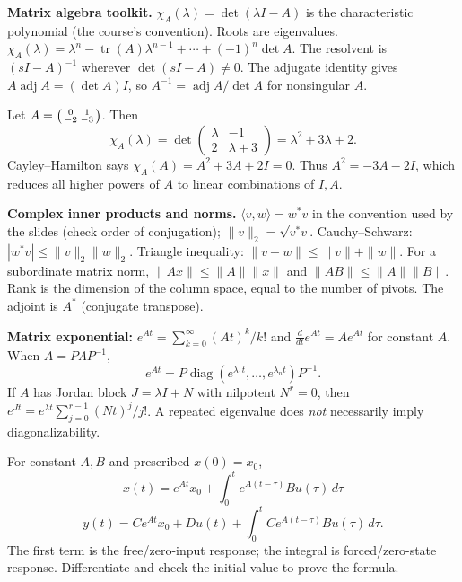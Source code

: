 \documentclass[10pt,a4paper]{article}
\begin{document}
\begin{formbox}\textbf{Matrix algebra toolkit.} $\chi_A(\lambda)=\det(\lambda I-A)$ is the characteristic polynomial (the course's convention). Roots are eigenvalues. $\chi_A(\lambda)=\lambda^n-\operatorname{tr}(A)\lambda^{n-1}+\cdots+(-1)^n\det A$. The resolvent is $(sI-A)^{-1}$ wherever $\det(sI-A)\ne0$. The adjugate identity gives $A\operatorname{adj}A=(\det A)I$, so $A^{-1}=\operatorname{adj}A/\det A$ for nonsingular $A$.\end{formbox}
\begin{workbox}[title={WORKED: characteristic polynomial, Cayley--Hamilton}]
Let $A=\begin{psmallmatrix}0&1\\-2&-3\end{psmallmatrix}$. Then
\[\chi_A(\lambda)=\det\begin{pmatrix}\lambda&-1\\2&\lambda+3\end{pmatrix}=\lambda^2+3\lambda+2.\]
Cayley--Hamilton says $\chi_A(A)=A^2+3A+2I=0$. Thus $A^2=-3A-2I$, which reduces all higher powers of $A$ to linear combinations of $I,A$.
\end{workbox}
\begin{defbox}\textbf{Complex inner products and norms.} $\langle v,w\rangle=w^*v$ in the convention used by the slides (check order of conjugation); $\|v\|_2=\sqrt{v^*v}$. Cauchy--Schwarz: $|w^*v|\le\|v\|_2\|w\|_2$. Triangle inequality: $\|v+w\|\le\|v\|+\|w\|$. For a subordinate matrix norm, $\|Ax\|\le\|A\|\|x\|$ and $\|AB\|\le\|A\|\|B\|$. Rank is the dimension of the column space, equal to the number of pivots. The adjoint is $A^*$ (conjugate transpose).\end{defbox}
\begin{formbox}\textbf{Matrix exponential:} $e^{At}=\sum_{k=0}^\infty (At)^k/k!$ and $\frac d{dt}e^{At}=Ae^{At}$ for constant $A$. When $A=P\Lambda P^{-1}$,
\[e^{At}=P\operatorname{diag}(e^{\lambda_1t},\ldots,e^{\lambda_nt})P^{-1}.\]
If $A$ has Jordan block $J=\lambda I+N$ with nilpotent $N^r=0$, then $e^{Jt}=e^{\lambda t}\sum_{j=0}^{r-1}(Nt)^j/j!$. A repeated eigenvalue does \emph{not} necessarily imply diagonalizability.
\end{formbox}
\begin{formbox}[title={THE CENTRAL SOLUTION FORMULA (variation of constants)}]
For constant $A,B$ and prescribed $x(0)=x_0$,
\[\boxed{x(t)=e^{At}x_0+\int_0^t e^{A(t-\tau)}Bu(\tau)\,d\tau}\]
\[y(t)=Ce^{At}x_0+D u(t)+\int_0^t Ce^{A(t-\tau)}Bu(\tau)\,d\tau.\]
The first term is the free/zero-input response; the integral is forced/zero-state response. Differentiate and check the initial value to prove the formula.
\end{formbox}
\end{document}
